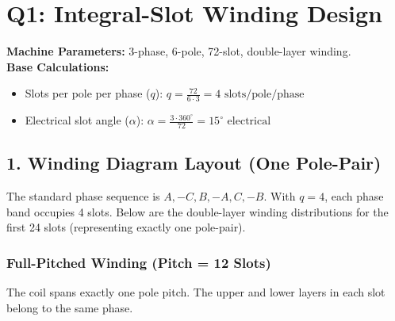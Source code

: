 \documentclass{article}
\begin{document}
\section*{Q1: Integral-Slot Winding Design}

\noindent
\textbf{Machine Parameters:} 3-phase, 6-pole, 72-slot, double-layer winding. \\
\textbf{Base Calculations:}
\begin{itemize}
    \item Slots per pole per phase ($q$): $q = \frac{72}{6 \cdot 3} = 4 \text{ slots/pole/phase}$
    \item Electrical slot angle ($\alpha$): $\alpha = \frac{3 \cdot 360^\circ}{72} = 15^\circ \text{ electrical}$
\end{itemize}

\hrulefill

\subsection*{1. Winding Diagram Layout (One Pole-Pair)}

The standard phase sequence is $A, -C, B, -A, C, -B$. With $q=4$, each phase band occupies 4 slots. Below are the double-layer winding distributions for the first 24 slots (representing exactly one pole-pair).

\subsubsection*{Full-Pitched Winding (Pitch = 12 Slots)}
The coil spans exactly one pole pitch. The upper and lower layers in each slot belong to the same phase.

\vspace{0.3cm}
\noindent
{}
\end{document}
